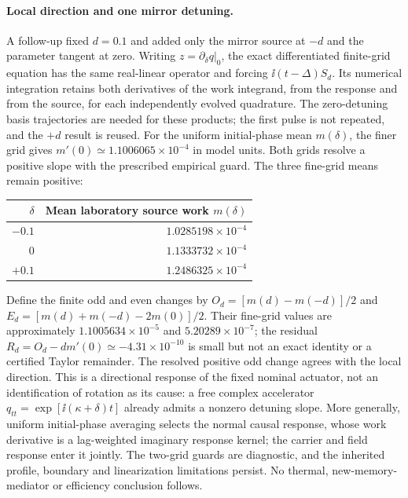 \paragraph{Local direction and one mirror detuning.}
A follow-up fixed $d=0.1$ and added only the mirror source at $-d$ and
the parameter tangent at zero. Writing $z=\partial_\delta q|_0$, the
exact differentiated finite-grid equation has the same real-linear
operator and forcing $\ii(t-\Delta)S_d$. Its numerical integration retains
both derivatives of the work integrand, from the response and from the
source, for each independently evolved quadrature. The zero-detuning
basis trajectories are needed for these products; the first pulse is
not repeated, and the $+d$ result is reused. For the uniform initial-phase
mean $m(\delta)$, the finer grid gives $m'(0)\simeq1.1006065\times10^{-4}$
in model units. Both grids resolve a positive slope with the prescribed
empirical guard. The three fine-grid means remain positive:
\begin{center}
\begin{tabular}{rr}
\toprule
$\delta$ & Mean laboratory source work $m(\delta)$\\
\midrule
$-0.1$ & $1.0285198\times10^{-4}$\\
$0$ & $1.1333732\times10^{-4}$\\
$+0.1$ & $1.2486325\times10^{-4}$\\
\bottomrule
\end{tabular}
\end{center}

Define the finite odd and even changes by
$O_d=[m(d)-m(-d)]/2$ and
$E_d=[m(d)+m(-d)-2m(0)]/2$.
Their fine-grid values are approximately $1.1005634\times10^{-5}$ and
$5.20289\times10^{-7}$; the residual
$R_d=O_d-dm'(0)\simeq-4.31\times10^{-10}$ is small but not an exact
identity or a certified Taylor remainder. The resolved positive odd
change agrees with the local direction. This is a directional response
of the fixed nominal actuator, not an identification of rotation as its
cause: a free complex accelerator $q_{tt}=\exp[\ii(\kappa+\delta)t]$ already
admits a nonzero detuning slope. More generally, uniform initial-phase
averaging selects the normal causal response, whose work derivative is
a lag-weighted imaginary response kernel; the carrier and field response
enter it jointly. The two-grid guards are diagnostic, and the inherited
profile, boundary and linearization limitations persist. No thermal,
new-memory-mediator or efficiency conclusion follows.
